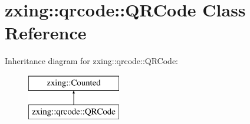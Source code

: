 \hypertarget{classzxing_1_1qrcode_1_1_q_r_code}{}\section{zxing\+:\+:qrcode\+:\+:Q\+R\+Code Class Reference}
\label{classzxing_1_1qrcode_1_1_q_r_code}
Inheritance diagram for zxing\+:\+:qrcode\+:\+:Q\+R\+Code\+:\begin{figure}[H]
\begin{center}
\leavevmode
\includegraphics[height=2.000000cm]{classzxing_1_1qrcode_1_1_q_r_code}
\end{center}
\end{figure}
